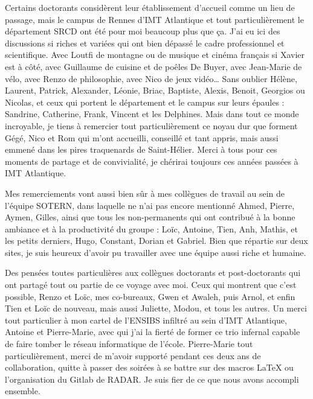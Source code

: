 Certains doctorants considèrent leur établissement d'accueil comme un lieu de passage, mais le campus de Rennes d'IMT Atlantique et tout particulièrement le département SRCD ont été pour moi beaucoup plus que ça.
J'ai eu ici des discussions si riches et variées qui ont bien dépassé le cadre professionnel et scientifique.
Avec Loutfi de montagne ou de musique et cinéma français si Xavier est à côté, avec Guillaume de cuisine et de poêles De Buyer, avec Jean-Marie de vélo, avec Renzo de philosophie, avec Nico de jeux vidéo\dots{}
Sans oublier Hélène, Laurent, Patrick, Alexander, Léonie, Briac, Baptiste, Alexis, Benoit, Georgios ou Nicolas, et ceux qui portent le département et le campus sur leurs épaules : Sandrine, Catherine, Frank, Vincent et les Delphines.
Mais dans tout ce monde incroyable, je tiens à remercier tout particulièrement ce noyau dur que forment Gégé, Nico et Rom qui m'ont accueilli, conseillé et tant appris, mais aussi emmené dans les pires traquenards de Saint-Hélier.
Merci à tous pour ces moments de partage et de convivialité, je chérirai toujours ces années passées à IMT Atlantique.

Mes remerciements vont aussi bien sûr à mes collègues de travail au sein de l'équipe SOTERN, dans laquelle ne n'ai pas encore mentionné Ahmed, Pierre, Aymen, Gilles, ainsi que tous les non-permanents qui ont contribué à la bonne ambiance et à la productivité du groupe : Loïc, Antoine, Tien, Anh, Mathis, et les petits derniers, Hugo, Constant, Dorian et Gabriel.
Bien que répartie sur deux sites, je suis heureux d'avoir pu travailler avec une équipe aussi riche et humaine.

Des pensées toutes particulières aux collègues doctorants et post-doctorants qui ont partagé tout ou partie de ce voyage avec moi.
Ceux qui montrent que c'est possible, Renzo et Loïc, mes co-bureaux, Gwen et Awaleh, puis Arnol, et enfin Tien et Loïc de nouveau, mais aussi Juliette, Modou, et tous les autres.
Un merci tout particulier à mon cartel de l'ENSIBS infiltré au sein d'IMT Atlantique, Antoine et Pierre-Marie, avec qui j'ai la fierté de former ce trio infernal capable de faire tomber le réseau informatique de l'école.
Pierre-Marie tout particulièrement, merci de m'avoir supporté pendant ces deux ans de collaboration, quitte à passer des soirées à se battre sur des macros \LaTeX{} ou l'organisation du Gitlab de RADAR.
Je suis fier de ce que nous avons accompli ensemble.

